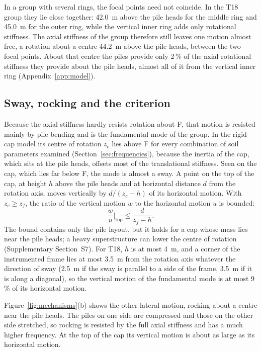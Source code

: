 \documentclass[11pt]{article}
\begin{document}
In a group with several rings, the focal points need not coincide. In the T18 group they lie close together: 42.0~m above the pile heads for the middle ring and 45.0~m for the outer ring, while the vertical inner ring adds only rotational stiffness. The axial stiffness of the group therefore still leaves one motion almost free, a rotation about a centre 44.2~m above the pile heads, between the two focal points. About that centre the piles provide only 2\,\% of the axial rotational stiffness they provide about the pile heads, almost all of it from the vertical inner ring (Appendix~\ref{app:model}).

\subsection{Sway, rocking and the criterion}
\label{sec:mechanisms}

Because the axial stiffness hardly resists rotation about F, that motion is resisted mainly by pile bending and is the fundamental mode of the group. In the rigid-cap model its centre of rotation $z_c$ lies above F for every combination of soil parameters examined (Section~\ref{sec:frequencies}), because the inertia of the cap, which sits at the pile heads, offsets most of the translational stiffness. Seen on the cap, which lies far below F, the mode is almost a sway. A point on the top of the cap, at height $h$ above the pile heads and at horizontal distance $d$ from the rotation axis, moves vertically by $d/(z_c-h)$ of its horizontal motion. With $z_c \geq z_f$, the ratio of the vertical motion $w$ to the horizontal motion $u$ is bounded:
%
\begin{equation}
\frac{w}{u}\bigg|_{\mathrm{top}} \leq \frac{d}{z_f - h} .
\label{eq:vh}
\end{equation}
%
The bound contains only the pile layout, but it holds for a cap whose mass lies near the pile heads; a heavy superstructure can lower the centre of rotation (Supplementary Section~S7). For T18, $h$ is at most 4~m, and a corner of the instrumented frame lies at most 3.5~m from the rotation axis whatever the direction of sway (2.5~m if the sway is parallel to a side of the frame, 3.5~m if it is along a diagonal), so the vertical motion of the fundamental mode is at most 9\,\% of its horizontal motion.

Figure~\ref{fig:mechanisms}(b) shows the other lateral motion, rocking about a centre near the pile heads. The piles on one side are compressed and those on the other side stretched, so rocking is resisted by the full axial stiffness and has a much higher frequency. At the top of the cap its vertical motion is about as large as its horizontal motion.
\end{document}
